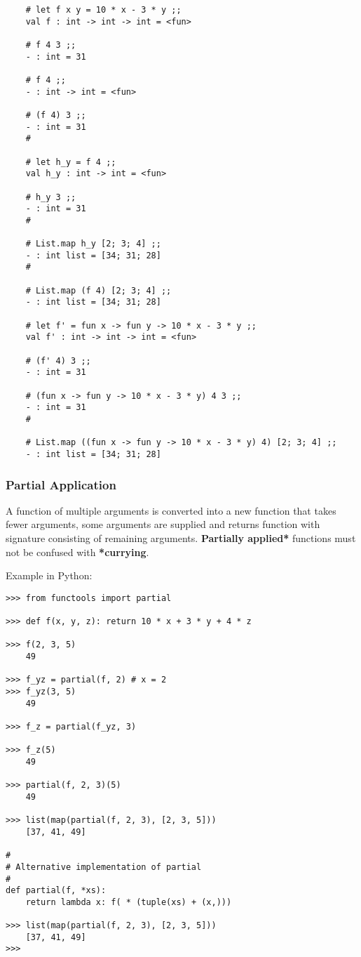 \documentclass[11pt]{article}
\begin{document}
\begin{verbatim}
    # let f x y = 10 * x - 3 * y ;;
    val f : int -> int -> int = <fun>

    # f 4 3 ;;
    - : int = 31

    # f 4 ;;
    - : int -> int = <fun>

    # (f 4) 3 ;;
    - : int = 31
    # 

    # let h_y = f 4 ;;
    val h_y : int -> int = <fun>

    # h_y 3 ;;
    - : int = 31
    # 

    # List.map h_y [2; 3; 4] ;;
    - : int list = [34; 31; 28]
    # 

    # List.map (f 4) [2; 3; 4] ;;
    - : int list = [34; 31; 28]

    # let f' = fun x -> fun y -> 10 * x - 3 * y ;;
    val f' : int -> int -> int = <fun>

    # (f' 4) 3 ;;
    - : int = 31

    # (fun x -> fun y -> 10 * x - 3 * y) 4 3 ;;
    - : int = 31
    # 

    # List.map ((fun x -> fun y -> 10 * x - 3 * y) 4) [2; 3; 4] ;;
    - : int list = [34; 31; 28]
\end{verbatim}

\subsubsection{Partial Application}
\label{sec-1-6-2}

A function of multiple arguments is converted into a new function that
takes fewer arguments, some arguments are supplied and returns
function with signature consisting of remaining arguments. \textbf{Partially
applied*} functions must not be confused with \textbf{*currying}.

Example in Python:

\begin{verbatim}
>>> from functools import partial

>>> def f(x, y, z): return 10 * x + 3 * y + 4 * z

>>> f(2, 3, 5)
    49

>>> f_yz = partial(f, 2) # x = 2
>>> f_yz(3, 5)
    49

>>> f_z = partial(f_yz, 3)

>>> f_z(5)
    49
    
>>> partial(f, 2, 3)(5)
    49
  
>>> list(map(partial(f, 2, 3), [2, 3, 5]))
    [37, 41, 49]

#
# Alternative implementation of partial
#
def partial(f, *xs):
    return lambda x: f( * (tuple(xs) + (x,)))

>>> list(map(partial(f, 2, 3), [2, 3, 5]))
    [37, 41, 49]
>>>
\end{verbatim}
\end{document}
